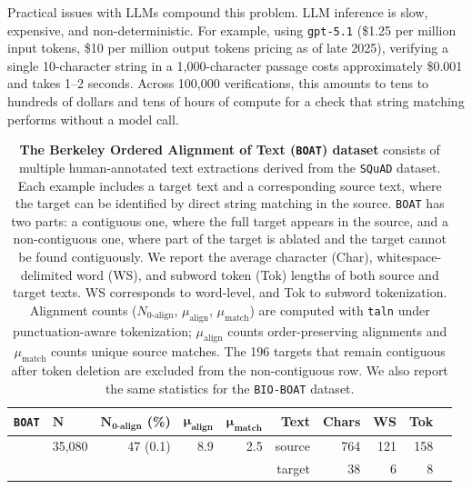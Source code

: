 \documentclass[pdflatex,lineno,referee,sn-vancouver-num]{sn-jnl}
\theoremstyle{thmstyleone}
\theoremstyle{thmstylethree}
\theoremstyle{thmstyletwo}
\begin{document}
Practical issues with LLMs compound this problem. LLM inference is slow, expensive, and non-deterministic. For example, using \texttt{gpt-5.1} (\$1.25 per million input tokens, \$10 per million output tokens pricing as of late 2025), verifying a single 10-character string in a 1,000-character passage costs approximately \$0.001 and takes 1--2 seconds. Across 100,000 verifications, this amounts to tens to hundreds of dollars and tens of hours of compute for a check that string matching performs without a model call.

\begin{table}[t!]
  \centering
  \caption{
  \textbf{The Berkeley Ordered Alignment of Text (\texttt{BOAT}) dataset} consists of multiple human-annotated text extractions derived from the \texttt{SQuAD} dataset. Each example includes a target text and a corresponding source text, where the target can be identified by direct string matching in the source. \texttt{BOAT} has two parts: a contiguous one, where the full target appears in the source, and a non-contiguous one, where part of the target is ablated and the target cannot be found contiguously. We report the average character (Char), whitespace-delimited word (WS), and subword token (Tok) lengths of both source and target texts. WS corresponds to word-level, and Tok to subword tokenization. Alignment counts ($N_{\text{0-align}}$, $\mu_{\text{align}}$, $\mu_{\text{match}}$) are computed with \texttt{taln} under punctuation-aware tokenization; $\mu_{\text{align}}$ counts order-preserving alignments and $\mu_{\text{match}}$ counts unique source matches. The 196 targets that remain contiguous after token deletion are excluded from the non-contiguous row. We also report the same statistics for the \texttt{BIO-BOAT} dataset.
  }
  \begin{tabular}{llrrrrrrrr}
  \toprule
  \textbf{\texttt{BOAT}} & $\mathbf{N}$ & $\mathbf{N_{\text{0-align}}}$ (\%) & $\mathbf{\mu_{\text{align}}}$ & $\mathbf{\mu_{\text{match}}}$ & \textbf{Text} & \textbf{Chars} & \textbf{WS} & \textbf{Tok} \\ 
  \midrule
  
  \multirow{2}{*}{}
   Contiguous & 35{,}080 & 47 (0.1) & 8.9 & 2.5 & source & 764 & 121 & 158\\
              &          &     &     &     & target & 38  & 6 & 8 \\
  \midrule
  

\end{tabular}
\end{table}
\end{document}
